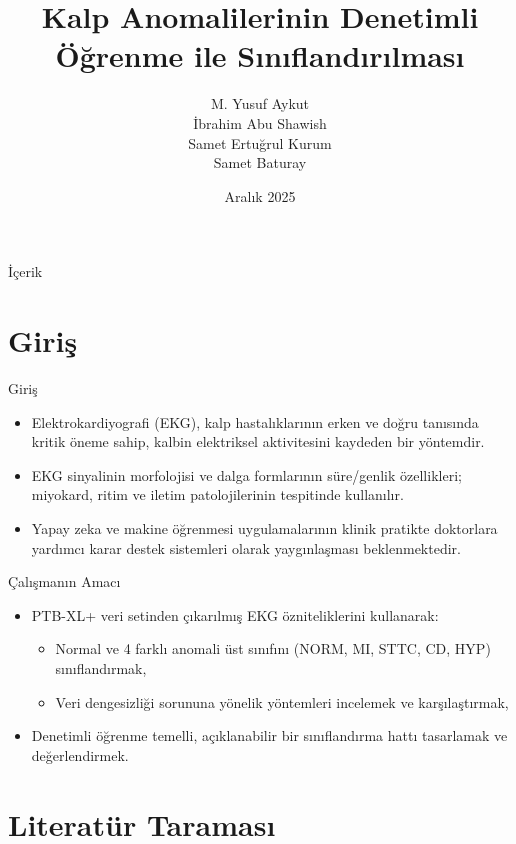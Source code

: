 \documentclass[aspectratio=169]{beamer}
\title{Kalp Anomalilerinin Denetimli Öğrenme ile Sınıflandırılması}
\author{M. Yusuf Aykut\\İbrahim Abu Shawish\\Samet Ertuğrul Kurum\\Samet Baturay}
\date{Aralık 2025}
\begin{document}
\begin{frame}
		\titlepage
\end{frame}

\begin{frame}{İçerik}
		\tableofcontents
\end{frame}

\section{Giriş}

\begin{frame}{Giriş}
	\begin{itemize}
		\item Elektrokardiyografi (EKG), kalp hastalıklarının erken ve doğru tanısında kritik öneme sahip, kalbin elektriksel aktivitesini kaydeden bir yöntemdir.
		\item EKG sinyalinin morfolojisi ve dalga formlarının süre/genlik özellikleri; miyokard, ritim ve iletim patolojilerinin tespitinde kullanılır.
		\item Yapay zeka ve makine öğrenmesi uygulamalarının klinik pratikte doktorlara yardımcı karar destek sistemleri olarak yaygınlaşması beklenmektedir.
	\end{itemize}
\end{frame}

\begin{frame}{Çalışmanın Amacı}
	\begin{itemize}
		\item PTB-XL+ veri setinden çıkarılmış EKG özniteliklerini kullanarak:
		\begin{itemize}
			\item Normal ve 4 farklı anomali üst sınıfını (NORM, MI, STTC, CD, HYP) sınıflandırmak,
			\item Veri dengesizliği sorununa yönelik yöntemleri incelemek ve karşılaştırmak,
		\end{itemize}
		\item Denetimli öğrenme temelli, açıklanabilir bir sınıflandırma hattı tasarlamak ve değerlendirmek.
	\end{itemize}
\end{frame}

\section{Literatür Taraması}
\end{document}
